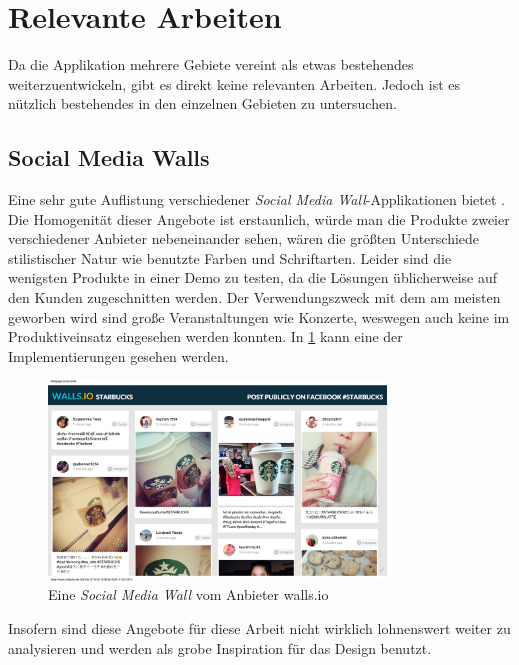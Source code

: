 \documentclass[12pt,twoside]{book}
\begin{document}
\section{Relevante Arbeiten}

Da die Applikation mehrere Gebiete vereint als etwas bestehendes weiterzuentwickeln, gibt es direkt keine relevanten Arbeiten. Jedoch ist es nützlich bestehendes in den einzelnen Gebieten zu untersuchen.

\subsection{Social Media Walls}

Eine sehr gute Auflistung verschiedener \textit{Social Media Wall}-Applikationen bietet \citep{hofram}. Die Homogenität dieser Angebote ist erstaunlich, würde man die Produkte zweier verschiedener Anbieter nebeneinander sehen, wären die größten Unterschiede stilistischer Natur wie benutzte Farben und Schriftarten. Leider sind die wenigsten Produkte in einer Demo zu testen, da die Lösungen üblicherweise auf den Kunden zugeschnitten werden. Der Verwendungszweck mit dem am meisten geworben wird sind große Veranstaltungen wie Konzerte, weswegen auch keine im Produktiveinsatz eingesehen werden konnten. In \ref{fig:socialwall} kann eine der Implementierungen gesehen werden.\\

\begin{figure}[H]
    \centering
    \includegraphics[width=0.8\textwidth]{images/Starbucks.png}
    \caption{Eine \textit{Social Media Wall} vom Anbieter walls.io \cite{wallsio}}
    \label{fig:socialwall}
\end{figure}

Insofern sind diese Angebote für diese Arbeit nicht wirklich lohnenswert weiter zu analysieren und werden als grobe Inspiration für das Design benutzt.
\end{document}
